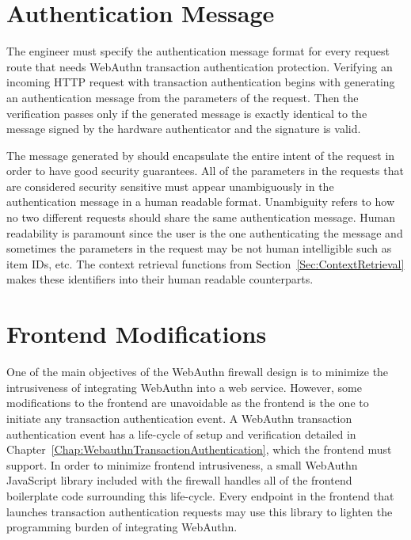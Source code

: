 

\section{Authentication Message}\label{Sec:AuthenticationMessage}

The engineer must specify the authentication message format for every request route that needs WebAuthn transaction authentication protection. Verifying an incoming HTTP request with transaction authentication begins with \sys{} generating an authentication message from the parameters of the request. Then the verification passes only if the generated message is exactly identical to the message signed by the hardware authenticator and the signature is valid.


The message generated by \sys{} should encapsulate the entire intent of the request in order to have good security guarantees. All of the parameters in the requests that are considered security sensitive must appear unambiguously in the authentication message in a human readable format. Unambiguity refers to how no two different requests should share the same authentication message. Human readability is paramount since the user is the one authenticating the message and sometimes the parameters in the request may be not human intelligible such as item IDs, etc. The context retrieval functions from Section~\ref{Sec:ContextRetrieval} makes these identifiers into their human readable counterparts.

\section{Frontend Modifications}

One of the main objectives of the WebAuthn firewall design is to minimize the intrusiveness of integrating WebAuthn into a web service. However, some modifications to the frontend are unavoidable as the frontend is the one to initiate any transaction authentication event. A WebAuthn transaction authentication event has a life-cycle of setup and verification detailed in Chapter~\ref{Chap:WebauthnTransactionAuthentication}, which the frontend must support. In order to minimize frontend intrusiveness, a small WebAuthn JavaScript library included with the firewall handles all of the frontend boilerplate code surrounding this life-cycle. Every endpoint in the frontend that launches transaction authentication requests may use this library to lighten the programming burden of integrating WebAuthn. 

